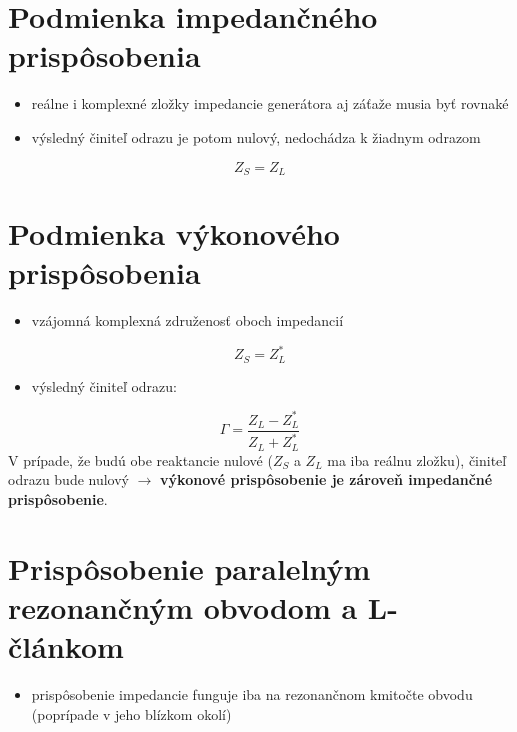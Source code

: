{{	\section{Podmienka impedančného prispôsobenia}
	\begin{itemize}[label=--]
	\item reálne i komplexné zložky impedancie generátora aj záťaže musia byť rovnaké
	\item výsledný činiteľ odrazu je potom nulový, nedochádza k žiadnym odrazom
	\end{itemize}
	\begin{equation}
		Z_S = Z_L
		\label{eq:impedan_prisp}
	\end{equation} 
	
	\section{Podmienka výkonového prispôsobenia}
	\begin{itemize}[label=--]
		\item vzájomná komplexná združenosť oboch impedancií
	\end{itemize}
	\begin{equation}
		Z_S = Z_L^*
		\label{eq:výkon_prisp}
	\end{equation}
	\begin{itemize}[label=--]
		\item výsledný činiteľ odrazu:
	\end{itemize}
	\begin{equation}
		\Gamma = \frac{Z_L-Z_L^*}{Z_L+Z_L^*}
	\end{equation}
	V prípade, že budú obe reaktancie nulové ($Z_S$ a $Z_L$ ma iba reálnu zložku), činiteľ odrazu bude nulový $\rightarrow$ \textbf{výkonové prispôsobenie je zároveň impedančné prispôsobenie}.
	\section{Prispôsobenie paralelným rezonančným obvodom a L-článkom}
	\begin{itemize}[label=--]
		\item prispôsobenie impedancie funguje iba na rezonančnom kmitočte obvodu (poprípade v jeho blízkom okolí)
	\end{itemize}

}}
